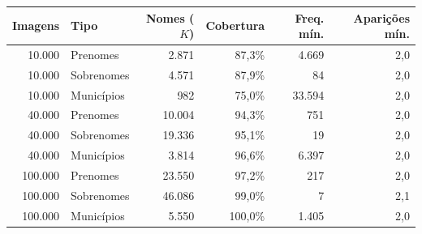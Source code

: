 \begin{tabular}{@{}rlrrrr@{}}
\toprule
Imagens & Tipo & Nomes ($K$) & Cobertura & Freq. mín. & Aparições mín. \\
\midrule
10.000 & Prenomes & 2.871 & 87,3\% & 4.669 & 2,0 \\
10.000 & Sobrenomes & 4.571 & 87,9\% & 84 & 2,0 \\
10.000 & Municípios & 982 & 75,0\% & 33.594 & 2,0 \\
\midrule
40.000 & Prenomes & 10.004 & 94,3\% & 751 & 2,0 \\
40.000 & Sobrenomes & 19.336 & 95,1\% & 19 & 2,0 \\
40.000 & Municípios & 3.814 & 96,6\% & 6.397 & 2,0 \\
\midrule
100.000 & Prenomes & 23.550 & 97,2\% & 217 & 2,0 \\
100.000 & Sobrenomes & 46.086 & 99,0\% & 7 & 2,1 \\
100.000 & Municípios & 5.550 & 100,0\% & 1.405 & 2,0 \\
\bottomrule
\end{tabular}
